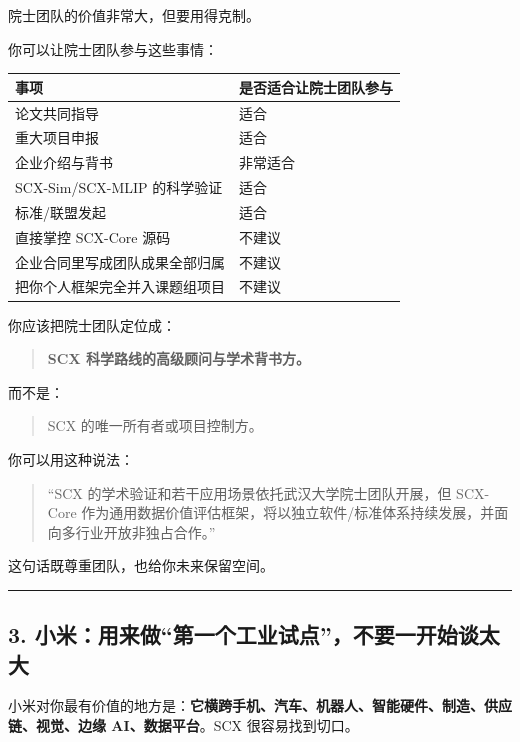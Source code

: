 \documentclass[
  12pt,
]{ctexart}
\begin{document}
院士团队的价值非常大，但要用得克制。

你可以让院士团队参与这些事情：

\begin{longtable}[]{@{}ll@{}}
\toprule\noalign{}
事项 & 是否适合让院士团队参与 \\
\midrule\noalign{}
\endhead
\bottomrule\noalign{}
\endlastfoot
论文共同指导 & 适合 \\
重大项目申报 & 适合 \\
企业介绍与背书 & 非常适合 \\
SCX-Sim/SCX-MLIP 的科学验证 & 适合 \\
标准/联盟发起 & 适合 \\
直接掌控 SCX-Core 源码 & 不建议 \\
企业合同里写成团队成果全部归属 & 不建议 \\
把你个人框架完全并入课题组项目 & 不建议 \\
\end{longtable}

你应该把院士团队定位成：

\begin{quote}
\textbf{SCX 科学路线的高级顾问与学术背书方。}
\end{quote}

而不是：

\begin{quote}
SCX 的唯一所有者或项目控制方。
\end{quote}

你可以用这种说法：

\begin{quote}
``SCX 的学术验证和若干应用场景依托武汉大学院士团队开展，但 SCX-Core
作为通用数据价值评估框架，将以独立软件/标准体系持续发展，并面向多行业开放非独占合作。''
\end{quote}

这句话既尊重团队，也给你未来保留空间。

\begin{center}\rule{0.5\linewidth}{0.5pt}\end{center}

\subsection{3.
小米：用来做``第一个工业试点''，不要一开始谈太大}\label{ux5c0fux7c73ux7528ux6765ux505aux7b2cux4e00ux4e2aux5de5ux4e1aux8bd5ux70b9ux4e0dux8981ux4e00ux5f00ux59cbux8c08ux592aux5927}

小米对你最有价值的地方是：\textbf{它横跨手机、汽车、机器人、智能硬件、制造、供应链、视觉、边缘
AI、数据平台}。SCX 很容易找到切口。
\end{document}
